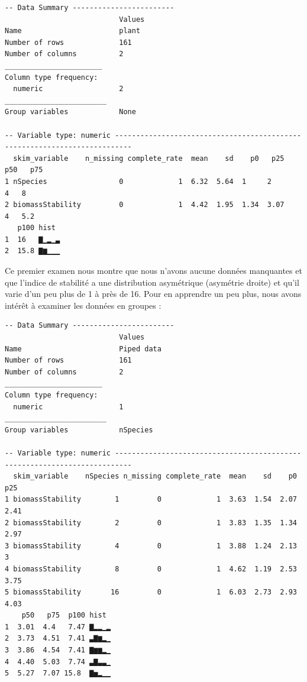 \documentclass[a4paperpaper,]{article}
\newenvironment{Shaded}{\begin{snugshade}}{\end{snugshade}}
\newcommand{\KeywordTok}[1]{\textcolor[rgb]{0.12,0.11,0.11}{\textbf{#1}}}
\newcommand{\NormalTok}[1]{\textcolor[rgb]{0.12,0.11,0.11}{#1}}
\newcommand{\OperatorTok}[1]{\textcolor[rgb]{0.12,0.11,0.11}{#1}}
\newcommand{\StringTok}[1]{\textcolor[rgb]{0.75,0.01,0.01}{#1}}
\begin{document}
\begin{verbatim}
-- Data Summary ------------------------
                           Values
Name                       plant 
Number of rows             161   
Number of columns          2     
_______________________          
Column type frequency:           
  numeric                  2     
________________________         
Group variables            None  

-- Variable type: numeric --------------------------------------------------------------------------
  skim_variable    n_missing complete_rate  mean    sd    p0   p25   p50   p75
1 nSpecies                 0             1  6.32  5.64  1     2        4   8  
2 biomassStability         0             1  4.42  1.95  1.34  3.07     4   5.2
   p100 hist 
1  16   ▇▁▂▁▃
2  15.8 ▇▆▁▁▁
\end{verbatim}

Ce premier examen nous montre que nous n'avons aucune données manquantes et que l'indice de stabilité a une distribution asymétrique (asymétrie droite) et qu'il varie d'un peu plus de 1 à près de 16. Pour en apprendre un peu plus, nous avons intérêt à examiner les données en groupes :

\begin{Shaded}
\end{Shaded}

\begin{verbatim}
-- Data Summary ------------------------
                           Values    
Name                       Piped data
Number of rows             161       
Number of columns          2         
_______________________              
Column type frequency:               
  numeric                  1         
________________________             
Group variables            nSpecies  

-- Variable type: numeric --------------------------------------------------------------------------
  skim_variable    nSpecies n_missing complete_rate  mean    sd    p0   p25
1 biomassStability        1         0             1  3.63  1.54  2.07  2.41
2 biomassStability        2         0             1  3.83  1.35  1.34  2.97
3 biomassStability        4         0             1  3.88  1.24  2.13  3   
4 biomassStability        8         0             1  4.62  1.19  2.53  3.75
5 biomassStability       16         0             1  6.03  2.73  2.93  4.03
    p50   p75  p100 hist 
1  3.01  4.4   7.47 ▇▂▂▁▂
2  3.73  4.51  7.41 ▃▇▆▂▁
3  3.86  4.54  7.41 ▇▆▆▂▁
4  4.40  5.03  7.74 ▃▇▃▃▁
5  5.27  7.07 15.8  ▇▅▂▁▁
\end{verbatim}
\end{document}
